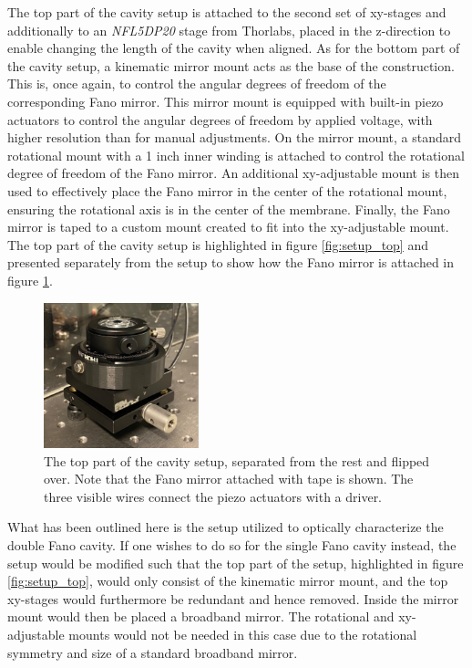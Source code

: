 The top part of the cavity setup is attached to the second set of xy-stages and additionally to an \emph{NFL5DP20} stage from Thorlabs\cite{z_stage}, placed in the z-direction to enable changing the length of the cavity when aligned. As for the bottom part of the cavity setup, a kinematic mirror mount acts as the base of the construction. This is, once again, to control the angular degrees of freedom of the corresponding Fano mirror. This mirror mount is equipped with built-in piezo actuators to control the angular degrees of freedom by applied voltage, with higher resolution than for manual adjustments. On the mirror mount, a standard rotational mount with a 1 inch inner winding is attached to control the rotational degree of freedom of the Fano mirror. An additional xy-adjustable mount is then used to effectively place the Fano mirror in the center of the rotational mount, ensuring the rotational axis is in the center of the membrane. Finally, the Fano mirror is taped to a custom mount created to fit into the xy-adjustable mount. The top part of the cavity setup is highlighted in figure \ref{fig:setup_top} and presented separately from the setup to show how the Fano mirror is attached in figure \ref{fig:cavity_setup_top_separate_pic}.

\begin{figure}[h!]
    \centering
    \includegraphics[width=0.4\textwidth]{figures/cavity_setup_top_separate_pic.pdf}
    \caption{The top part of the cavity setup, separated from the rest and flipped over. Note that the Fano mirror attached with tape is shown. The three visible wires connect the piezo actuators with a driver.}
    \label{fig:cavity_setup_top_separate_pic}    
\end{figure}

What has been outlined here is the setup utilized to optically characterize the double Fano cavity. If one wishes to do so for the single Fano cavity instead, the setup would be modified such that the top part of the setup, highlighted in figure \ref{fig:setup_top}, would only consist of the kinematic mirror mount, and the top xy-stages would furthermore be redundant and hence removed. Inside the mirror mount would then be placed a broadband mirror. The rotational and xy-adjustable mounts would not be needed in this case due to the rotational symmetry and size of a standard broadband mirror.

